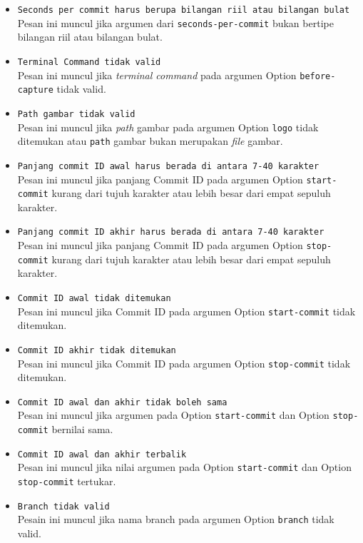 \begin{itemize}
\item \texttt{Seconds per commit harus berupa bilangan riil atau bilangan bulat}\\
Pesan ini muncul jika argumen dari \texttt{seconds-per-commit} bukan bertipe bilangan riil atau bilangan bulat. 
\item \texttt{Terminal Command tidak valid}\\
Pesan ini muncul jika \textit{terminal command} pada argumen Option \texttt{before-capture} tidak valid.
\item \texttt{Path gambar tidak valid}\\
Pesan ini muncul jika \textit{path} gambar pada argumen Option \texttt{logo} tidak ditemukan atau \texttt{path} gambar bukan merupakan \textit{file} gambar.
\item \texttt{Panjang commit ID awal harus berada di antara 7-40 karakter}\\
Pesan ini muncul jika panjang Commit ID pada argumen Option \texttt{start-commit} kurang dari tujuh karakter atau lebih besar dari empat sepuluh karakter.
\item \texttt{Panjang commit ID akhir harus berada di antara 7-40 karakter}\\
Pesan ini muncul jika panjang Commit ID pada argumen Option \texttt{stop-commit} kurang dari tujuh karakter atau lebih besar dari empat sepuluh karakter.
\item \texttt{Commit ID awal tidak ditemukan}\\
Pesan ini muncul jika Commit ID pada argumen Option \texttt{start-commit} tidak ditemukan.
\item \texttt{Commit ID akhir tidak ditemukan}\\
Pesan ini muncul jika Commit ID pada argumen Option \texttt{stop-commit} tidak ditemukan.
\item \texttt{Commit ID awal dan akhir tidak boleh sama}\\
Pesan ini muncul jika argumen pada Option \texttt{start-commit} dan Option \texttt{stop-commit} bernilai sama.
\item \texttt{Commit ID awal dan akhir terbalik}\\
Pesan ini muncul jika nilai argumen pada Option \texttt{start-commit} dan Option \texttt{stop-commit} tertukar.
\item \texttt{Branch tidak valid}\\
Pesain ini muncul jika nama branch pada argumen Option \texttt{branch} tidak valid.
\end{itemize}

